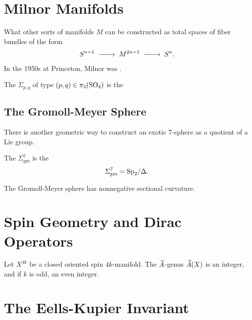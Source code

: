 
\section{Milnor Manifolds}

What other sorts of manifolds $M$ can be constructed as total spaces of fiber bundles of the form
\[
    S^{n-1} \lkxto M^{2n-1} \lkxto S^n.
\]

\begin{historicalremark*}
  In the 1950s at Princeton, Milnor was \cite{milnor2000exotic}. 
\end{historicalremark*}


\begin{definition}
	The  $\Sigma_{p,q}$ of type $(p,q)\in \pi_3({\operatorname{SO}}_4)$ is the
\end{definition}

\subsection*{The Gromoll-Meyer Sphere}

There is another geometric way to construct an exotic $7$-sphere as a quotient of a Lie group.

\begin{definition}
	The  $\Sigma_{\mathrm{gm}}^7$ is the 
	\[
      \Sigma_{\mathrm{gm}}^7 = {\operatorname{Sp}}_2/\Delta.
	\]
\end{definition}

\begin{theorem}
  The Gromoll-Meyer sphere has nonnegative sectional curvature.
\end{theorem}

\section{Spin Geometry and Dirac Operators}

\begin{theorem}
  Let $X^{4k}$ be a closed oriented spin $4k$-manifold. The $\widehat{A}$-genus $\widehat{A}(X)$ is an integer, and if $k$ is odd, an even integer.
\end{theorem}

\section{The Eells-Kupier Invariant}\label{sec:eels-kuper_invariant}

